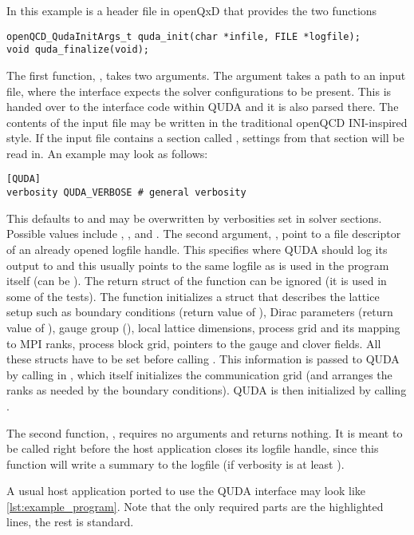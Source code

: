 In this example  is a header file in openQxD that provides the two functions
\begin{verbatim}
openQCD_QudaInitArgs_t quda_init(char *infile, FILE *logfile);
void quda_finalize(void);
\end{verbatim}
The first function, , takes two arguments. The  argument takes a path to an input file, where the interface expects the solver configurations to be present. This is handed over to the interface code within QUDA and it is also parsed there. The contents of the input file may be written in the traditional openQCD INI-inspired style. If the input file contains a section called , settings from that section will be read in. An example may look as follows:
\begin{verbatim}
[QUDA]
verbosity QUDA_VERBOSE # general verbosity
\end{verbatim}
This defaults to  and may be overwritten by verbosities set in solver sections. Possible values include , ,  and .
The second argument, , point to a file descriptor of an already opened logfile handle. This specifies where QUDA should log its output to and this usually points to the same logfile as is used in the program itself (can be ).
The return struct of the function can be ignored (it is used in some of the tests). The function initializes a struct that describes the lattice setup such as boundary conditions (return value of ), Dirac parameters (return value of ), gauge group (), local lattice dimensions, process grid and its mapping to MPI ranks, process block grid, pointers to the gauge and clover fields. All these structs have to be set before calling . This information is passed to QUDA by calling  in , which itself initializes the communication grid (and arranges the ranks as needed by the boundary conditions). QUDA is then initialized by calling .

The second function, , requires no arguments and returns nothing. It is meant to be called right before the host application closes its logfile handle, since this function will write a summary to the logfile (if verbosity is at least ).

A usual host application ported to use the QUDA interface may look like \cref{lst:example_program}. Note that the only required parts are the highlighted lines, the rest is standard.

